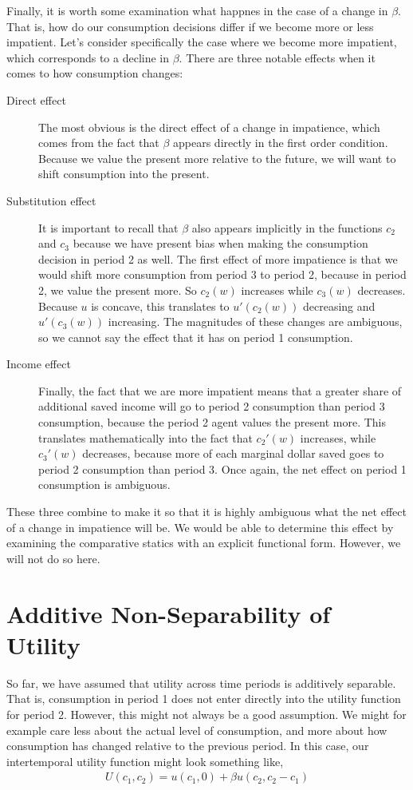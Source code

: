 Finally, it is worth some examination what happnes in the case of a change in $\beta$. That is, how do our consumption decisions differ if we become more or less impatient. Let's consider specifically the case where we become more impatient, which corresponds to a decline in $\beta$. There are three notable effects when it comes to how consumption changes:
\begin{description}
    \item[Direct effect] The most obvious is the direct effect of a change in impatience, which comes from the fact that $\beta$ appears directly in the first order condition. Because we value the present more relative to the future, we will want to shift consumption into the present. 
    \item[Substitution effect] It is important to recall that $\beta$ also appears implicitly in the functions $c_2$ and $c_3$ because we have present bias when making the consumption decision in period 2 as well. The first effect of more impatience is that we would shift more consumption from period 3 to period 2, because in period 2, we value the present more. So $c_2(w)$ increases while $c_3(w)$ decreases. Because $u$ is concave, this translates to $u'(c_2(w))$ decreasing and $u'(c_3(w))$ increasing. The magnitudes of these changes are ambiguous, so we cannot say the effect that it has on period 1 consumption.
    \item[Income effect] Finally, the fact that we are more impatient means that a greater share of additional saved income will go to period 2 consumption than period 3 consumption, because the period 2 agent values the present more. This translates mathematically into the fact that $c_2'(w)$ increases, while $c_3'(w)$ decreases, because more of each marginal dollar saved goes to period 2 consumption than period 3. Once again, the net effect on period 1 consumption is ambiguous. 
\end{description}
These three combine to make it so that it is highly ambiguous what the net effect of a change in impatience will be. We would be able to determine this effect by examining the comparative statics with an explicit functional form. However, we will not do so here.

\section{Additive Non-Separability of Utility}
So far, we have assumed that utility across time periods is additively separable. That is, consumption in period 1 does not enter directly into the utility function for period 2. However, this might not always be a good assumption. We might for example care less about the actual level of consumption, and more about how consumption has changed relative to the previous period. In this case, our intertemporal utility function might look something like,
\begin{align*}
    U(c_1, c_2) = u(c_1, 0) + \beta u(c_2, c_2 - c_1)
\end{align*}

